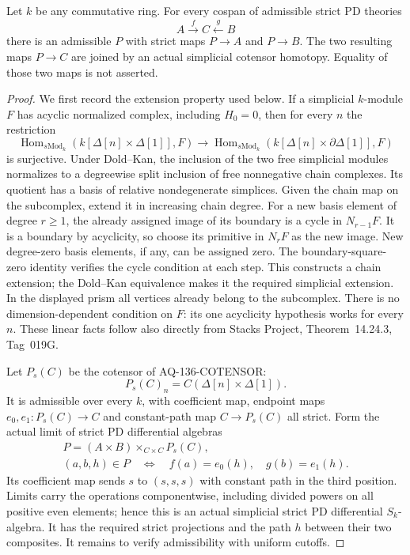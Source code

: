 Let $k$ be any commutative ring. For every cospan of admissible
strict PD theories
\[
                         A\xrightarrow{f}C
                                      \xleftarrow{g}B
                                                               \tag{136.CS1}
\]
there is an admissible $P$ with strict maps $P\to A$ and
$P\to B$. The two resulting maps $P\to C$ are joined by
an actual simplicial cotensor homotopy. Equality of those
two maps is not asserted.

\begin{proof}
We first record the extension property used below. If a
simplicial $k$-module $F$ has acyclic normalized complex,
including $H_0=0$, then for every $n$ the restriction
\[
 \operatorname{Hom}_{s\mathrm{Mod}_k}
       (k[\Delta[n]\times\Delta[1]],F)
   \longrightarrow
 \operatorname{Hom}_{s\mathrm{Mod}_k}
       (k[\Delta[n]\times\partial\Delta[1]],F)
                                                               \tag{136.CS2}
\]
is surjective. Under Dold--Kan, the inclusion of the two
free simplicial modules normalizes to a degreewise split
inclusion of free nonnegative chain complexes. Its quotient
has a basis of relative nondegenerate simplices.
Given the chain map on the subcomplex, extend it in
increasing chain degree. For a new basis element of degree
$r\ge1$, the already assigned image of its boundary is a
cycle in $N_{r-1}F$. It is a boundary by acyclicity, so
choose its primitive in $N_rF$ as the new image. New
degree-zero basis elements, if any, can be assigned zero.
The boundary-square-zero identity verifies the cycle
condition at each step. This constructs a chain extension;
the Dold--Kan equivalence makes it the required simplicial
extension. In the displayed prism all vertices already
belong to the subcomplex. There is no dimension-dependent
condition on $F$: its one acyclicity hypothesis works for
every $n$. These linear facts follow also directly from
Stacks Project, Theorem~14.24.3, Tag~019G.

Let $P_s(C)$ be the cotensor of AQ-136-COTENSOR:
\[
                P_s(C)_n=C(\Delta[n]\times\Delta[1]).
\]
It is admissible over every $k$, with coefficient map,
endpoint maps $e_0,e_1:P_s(C)\to C$ and constant-path map
$C\to P_s(C)$ all strict. Form the actual limit of strict
PD differential algebras
\[
 \begin{gathered}
        P=(A\times B)\times_{C\times C}P_s(C),\\
 (a,b,h)\in P\quad\Longleftrightarrow\quad
                   f(a)=e_0(h),\quad g(b)=e_1(h).
 \end{gathered}                                            \tag{136.CS3}
\]
Its coefficient map sends $s$ to $(s,s,s)$ with constant
path in the third position. Limits carry the operations
componentwise, including divided powers on all positive
even elements; hence this is an actual simplicial strict
PD differential $S_k$-algebra. It has the required strict
projections and the path $h$ between their two composites.
It remains to verify admissibility with uniform cutoffs.


\end{proof}
